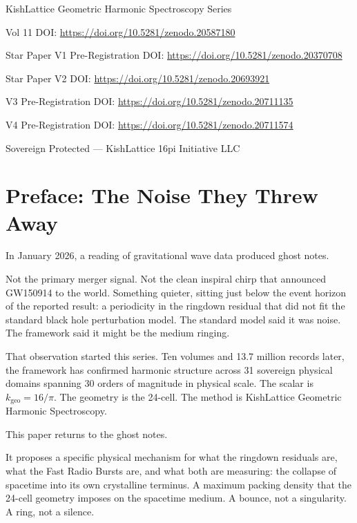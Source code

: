 \documentclass[11pt, letterpaper, openany]{book}
\begin{document}
\begin{titlepage}
    \vspace{0.4cm}
    {\normalsize KishLattice Geometric Harmonic Spectroscopy Series \par}
    {\normalsize Vol 11 DOI: \url{https://doi.org/10.5281/zenodo.20587180} \par}
    {\normalsize Star Paper V1 Pre-Registration DOI: \url{https://doi.org/10.5281/zenodo.20370708} \par}
    {\normalsize Star Paper V2 DOI: \url{https://doi.org/10.5281/zenodo.20693921} \par}
    {\normalsize V3 Pre-Registration DOI: \url{https://doi.org/10.5281/zenodo.20711135} \par}
	{\normalsize V4 Pre-Registration DOI: \url{https://doi.org/10.5281/zenodo.20711574} \par}
    \vspace{0.3cm}
    {\small Sovereign Protected --- KishLattice 16pi Initiative LLC \par}
\end{titlepage}
\tableofcontents
\clearpage
\chapter*{Preface: The Noise They Threw Away}

In January 2026, a reading of gravitational wave data produced ghost notes.

Not the primary merger signal. Not the clean inspiral chirp that announced
GW150914 to the world. Something quieter, sitting just below the event
horizon of the reported result: a periodicity in the ringdown residual that
did not fit the standard black hole perturbation model. The standard model
said it was noise. The framework said it might be the medium ringing.

That observation started this series. Ten volumes and 13.7 million records
later, the framework has confirmed harmonic structure across 31 sovereign
physical domains spanning 30 orders of magnitude in physical scale.
The scalar is $k_\text{geo} = 16/\pi$. The geometry is the 24-cell.
The method is KishLattice Geometric Harmonic Spectroscopy.

This paper returns to the ghost notes.

It proposes a specific physical mechanism for what the ringdown residuals
are, what the Fast Radio Bursts are, and what both are measuring: the
collapse of spacetime into its own crystalline terminus. A maximum packing
density that the 24-cell geometry imposes on the spacetime medium. A bounce,
not a singularity. A ring, not a silence.
\end{document}
